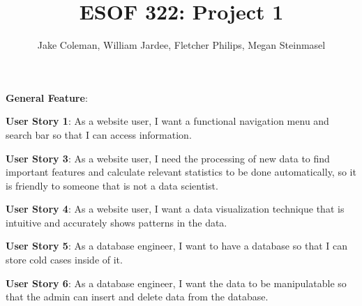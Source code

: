 \documentclass[11pt]{article}
\begin{document}
\title{ESOF 322: Project 1}
\author{Jake Coleman, William Jardee, Fletcher Philips, Megan Steinmasel}
\maketitle





\textbf{General Feature}: \vspace{1.5em}

\noindent\textbf{User Story 1}:  As a website user, I want a functional navigation menu and search bar so that I can access information.\vspace{0.5em}

\noindent\textbf{User Story 3}: As a website user, I need the processing of new data to find important features and calculate relevant statistics to be done automatically, so it is friendly to someone that is not a data scientist.\vspace{0.5em}

\noindent\textbf{User Story 4}: As a website user, I want a data visualization technique that is intuitive and accurately shows patterns in the data.\vspace{0.5em}

\noindent\textbf{User Story 5}: As a database engineer, I want to have a database so that I can store cold cases inside of it. \vspace{0.5em}

\noindent\textbf{User Story 6}: As a database engineer, I want the data to be manipulatable so that the admin can insert and delete data from the database.\vspace{0.5em}
\end{document}
